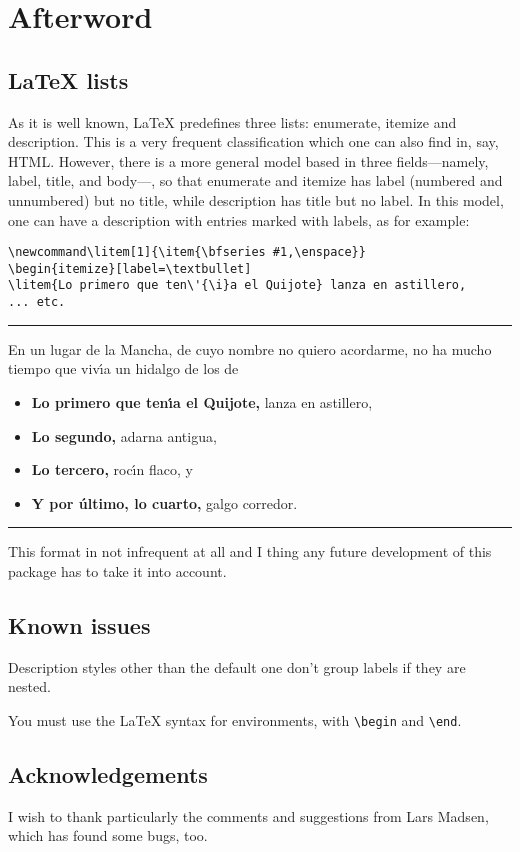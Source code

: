 \documentclass{article}
\begin{document}
\fi

\normalsize

\section{Afterword}

\subsection{\LaTeX{} lists}

As it is well known, \LaTeX{} predefines three lists: enumerate,
itemize and description.  This is a very frequent classification which
one can also find in, say, HTML. However, there is a more general
model based in three fields---namely, label, title, and body---, so
that enumerate and itemize has label (numbered and unnumbered) but
no title, while description has title but no label. In this model,
one can have a description with entries marked with labels, as for
example:
\begin{verbatim}
\newcommand\litem[1]{\item{\bfseries #1,\enspace}}
\begin{itemize}[label=\textbullet]
\litem{Lo primero que ten\'{\i}a el Quijote} lanza en astillero,
... etc.
\end{verbatim}

\vskip6pt
\goodbreak
\hrule
\vskip6pt

\newcommand\litem[1]{\item{\bfseries #1,\enspace}}
En un lugar de la Mancha, de cuyo nombre no quiero acordarme,
no ha mucho tiempo que viv\'{\i}a un hidalgo de los de
\begin{itemize}[label=\textbullet]
\litem{Lo primero que ten\'{\i}a el Quijote} lanza en astillero,
\litem{Lo segundo} adarna antigua,
\litem{Lo tercero} roc\'{\i}n flaco, y
\litem{Y por \'{u}ltimo, lo cuarto} galgo corredor.
\end{itemize}

\vskip6pt
\goodbreak
\hrule
\vskip6pt

This format in not infrequent at all and I thing any future
development of this package has to take it into account.

\subsection{Known issues}

Description styles other than the default one don't group
labels if they are nested.

You must use the \LaTeX{} syntax for environments, with \verb|\begin| 
and \verb|\end|.

\subsection{Acknowledgements}

I wish to thank particularly the comments and suggestions from Lars
Madsen, which has found some bugs, too.
\end{document}

